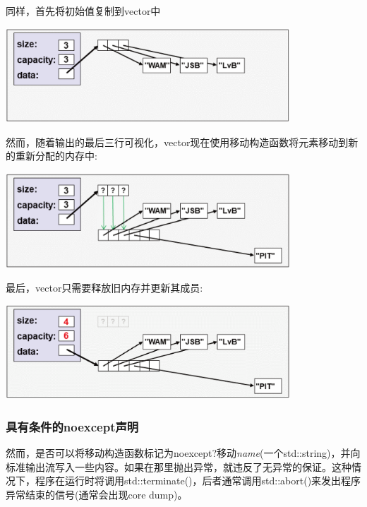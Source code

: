 同样，首先将初始值复制到vector中

\begin{center}
	\includegraphics[width=0.8\textwidth]{part1/ch7/images/4}
\end{center}

然而，随着输出的最后三行可视化，vector现在使用移动构造函数将元素移动到新的重新分配的内存中:

\begin{center}
	\includegraphics[width=0.8\textwidth]{part1/ch7/images/5}
\end{center}

最后，vector只需要释放旧内存并更新其成员:

\begin{center}
	\includegraphics[width=0.8\textwidth]{part1/ch7/images/6}
\end{center}

\subsubsection{具有条件的noexcept声明}

然而，是否可以将移动构造函数标记为noexcept?移动\textit{name}(一个std::string)，并向标准输出流写入一些内容。如果在那里抛出异常，就违反了无异常的保证。这种情况下，程序在运行时将调用std::terminate()，后者通常调用std::abort()来发出程序异常结束的信号(通常会出现core dump)。

